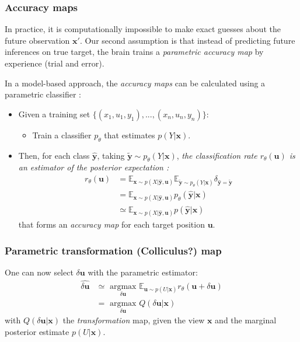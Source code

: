 \subsubsection{Accuracy maps}

In practice, it is computationally impossible to make exact guesses about the future observation $\boldsymbol{x}'$. Our second assumption is that instead of predicting future inferences on true target, the brain trains a \emph{parametric accuracy map} by experience (trial and error).


In a model-based approach, the \emph{accuracy maps} can be calculated using a parametric classifier :
 \begin{itemize}
 \item Given a training set $\{(x_1, u_1, y_1), ..., (x_n, u_n, y_n)\}$:
 \begin{itemize}
 \item Train a classifier $p_\theta$ that estimates $p(Y|\boldsymbol{x})$.
 \end{itemize}
 \item Then, for each class $\hat{\boldsymbol{y}}$, taking $\tilde{\boldsymbol{y}}\sim p_\theta(Y|\boldsymbol{x})$,\emph{ the classification rate $r_\theta(\boldsymbol{u})$ is an estimator of the posterior expectation :}
 \begin{align*}
 r_\theta(\boldsymbol{u})
 &= \mathbb{E}_{ \boldsymbol{x} \sim p(X|\hat{\boldsymbol{y}}, \boldsymbol{u})}
 \mathbb{E}_{\tilde{\boldsymbol{y}}\sim p_\theta(Y|\boldsymbol{x})} \delta_{\hat{\boldsymbol{y}}=\tilde{\boldsymbol{y}}}\\
 &= \mathbb{E}_{ \boldsymbol{x} \sim p(X|\hat{\boldsymbol{y}}, \boldsymbol{u})} p_\theta(\hat{\boldsymbol{y}}|\boldsymbol{x})\\
 &\simeq \mathbb{E}_{ \boldsymbol{x} \sim p(X|\hat{\boldsymbol{y}}, \boldsymbol{u})} p(\hat{\boldsymbol{y}}|\boldsymbol{x})
 \end{align*}
 that forms an \emph{accuracy map} for each target position $\boldsymbol{u}$.\\
 \end{itemize}

\subsubsection{Parametric transformation (Colliculus?) map}

One can now select $\delta\boldsymbol{u}$ with the parametric estimator:
\begin{align*}
\widehat{\delta\boldsymbol{u}} &\simeq \underset{\delta\boldsymbol{u}}{\text{ argmax }}
\mathbb{E}_{\boldsymbol{u}\sim p(U|\boldsymbol{x})}
r_\theta(\boldsymbol{u}+\delta\boldsymbol{u})\\
&= \underset{\delta\boldsymbol{u}}{\text{ argmax }} Q(\delta\boldsymbol{u}|\boldsymbol{x})
\end{align*}
with $Q(\delta\boldsymbol{u}|\boldsymbol{x})$ the \emph{transformation} map, given the view $\boldsymbol{x}$ and the marginal posterior estimate $p(U|\boldsymbol{x})$.

